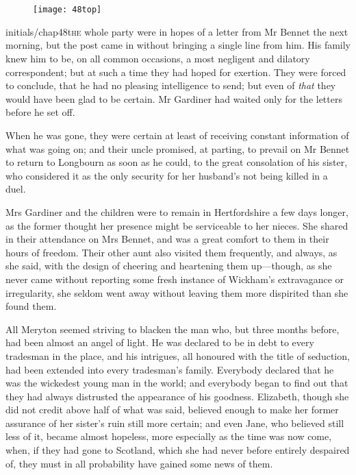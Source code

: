 \chapter[Chapter \thechapter]{}
	
	
\begin{figure}[t!]
\centering
\texttt{[image: 48top]}
\end{figure}


\lettrine[lines=6,image=true]{initials/chap48t}{he}  whole party were in hopes of a letter from Mr Bennet the next morning, but the post came in without bringing a single line from him. His family knew him to be, on all common occasions, a most negligent and dilatory correspondent; but at such a time they had hoped for exertion. They were forced to conclude, that he had no pleasing intelligence to send; but even of \textit{that} they would have been glad to be certain. Mr Gardiner had waited only for the letters before he set off.

When he was gone, they were certain at least of receiving constant information of what was going on; and their uncle promised, at parting, to prevail on Mr Bennet to return to Longbourn as soon as he could, to the great consolation of his sister, who considered it as the only security for her husband's not being killed in a duel.

Mrs Gardiner and the children were to remain in Hertfordshire a few days longer, as the former thought her presence might be serviceable to her nieces. She shared in their attendance on Mrs Bennet, and was a great comfort to them in their hours of freedom. Their other aunt also visited them frequently, and always, as she said, with the design of cheering and heartening them up—though, as she never came without reporting some fresh instance of Wickham's extravagance or irregularity, she seldom went away without leaving them more dispirited than she found them.

All Meryton seemed striving to blacken the man who, but three months before, had been almost an angel of light. He was declared to be in debt to every tradesman in the place, and his intrigues, all honoured with the title of seduction, had been extended into every tradesman's family. Everybody declared that he was the wickedest young man in the world; and everybody began to find out that they had always distrusted the appearance of his goodness. Elizabeth, though she did not credit above half of what was said, believed enough to make her former assurance of her sister's ruin still more certain; and even Jane, who believed still less of it, became almost hopeless, more especially as the time was now come, when, if they had gone to Scotland, which she had never before entirely despaired of, they must in all probability have gained some news of them.

